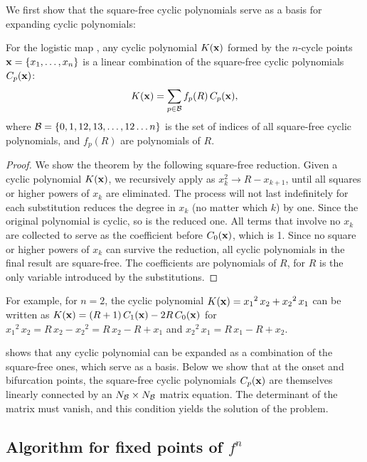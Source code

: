 \documentclass{ws-ijbc}
\begin{document}
We first show that
  the square-free cyclic polynomials
  serve as a basis for expanding cyclic polynomials:



\begin{theorem}
  For the logistic map ,
  any cyclic polynomial $K(\mathbf{x})$
  formed by the $n$-cycle points
  $\mathbf{x} = \{x_1, \ldots, x_n\}$
  is a linear combination of
the square-free cyclic polynomials $C_p(\mathbf{x})$:
\[
  K(\mathbf{x}) = \sum_{p \in \mathcal B} f_p(R) \, C_p(\mathbf{x}),
\]
  where $\mathcal B = \{0, 1, 12, 13, \ldots, 12\dots n\}$ is
  the set of indices of all square-free cyclic polynomials,
  and $f_p(R)$ are polynomials of $R$.
  \label{thm:sqrfree}
\end{theorem}


\begin{proof}
We show the theorem by the following square-free reduction.
%
Given a cyclic polynomial $K(\mathbf{x})$,
  we recursively apply  as
  $x_k^2 \rightarrow R - x_{k+1}$,
  until all squares or higher powers of $x_k$ are eliminated.
The process will not last indefinitely
  for each substitution reduces the degree in $x_k$ (no matter which $k$)
  by one.
Since the original polynomial is cyclic,
  so is the reduced one.
All terms that involve no $x_k$
  are collected to serve as the coefficient before $C_0(\mathbf{x})$, which is 1.
Since no square or higher powers of $x_k$
  can survive the reduction,
  all cyclic polynomials in the final result
  are square-free.
The coefficients are polynomials of $R$,
  for $R$ is the only variable introduced by the substitutions.
\end{proof}


For example, for $n = 2$, the cyclic polynomial
  $K(\mathbf{x}) = {x_1}^2 \, x_2 + {x_2}^2 \, x_1$
can be written as $K(\mathbf{x}) = (R + 1) \, C_{1}(\mathbf{x}) - 2 R \, C_0(\mathbf{x})$
for
${x_1}^2 \, x_2 = R \, x_2 - {x_2}^2 = R \, x_2 - R + x_1$ and
${x_2}^2 \, x_1 = R \, x_1 - R + x_2$.


  shows that any cyclic polynomial
  can be expanded
  as a combination of the square-free ones,
  which serve as a basis.
Below we show that at the onset and bifurcation points,
  the square-free cyclic polynomials $C_p(\mathbf{x})$ are themselves
  linearly connected by an $N_\mathcal B \times N_\mathcal B$ matrix equation.
The determinant of the matrix must vanish,
  and this condition yields the solution of the problem.


\subsection{\label{sec:algo}Algorithm for fixed points of $f^n$}
\end{document}
